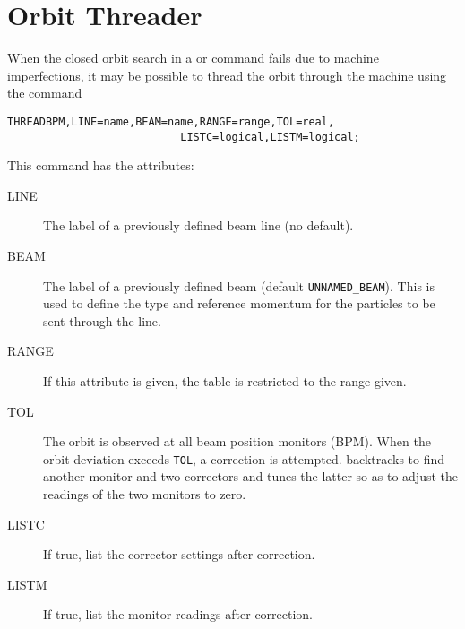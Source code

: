 \section{Orbit Threader}
\label{sec:thread}
When the closed orbit search in a  or
 command fails due to machine imperfections, 
it may be possible to thread the orbit through the machine using the command 
\begin{verbatim}
THREADBPM,LINE=name,BEAM=name,RANGE=range,TOL=real,
                           LISTC=logical,LISTM=logical;
\end{verbatim}
This command has the attributes:
\begin{description}
\item[LINE]
  The label of a previously defined beam line (no default).
\item[BEAM]
  The label of a previously defined beam (default \texttt{UNNAMED\_BEAM}).
  This is used to define the type and reference momentum for the
  particles to be sent through the line.
\item[RANGE]
  If this attribute is given, the table is restricted to the range given.
\item[TOL]
  The orbit is observed at all beam position monitors (BPM).
  When the orbit deviation exceeds \texttt{TOL},
  a correction is attempted.
  \opal backtracks to find another monitor and two correctors and tunes the
  latter so as to adjust the readings of the two monitors to zero.
\item[LISTC]
  If true, list the corrector settings after correction.
\item[LISTM]
  If true, list the monitor readings after correction.
\end{description}


